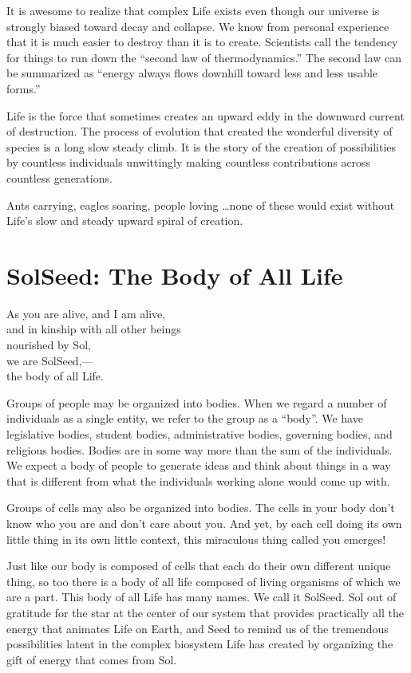 \documentclass[ebook,12pt,openany,twoside]{memoir}
\newcommand{\tab}{\hspace*{2em}}
\newcommand{\imagefacingchapter}[1]{
  \cleartoverso
  \clearpage \null
  \thispagestyle{cleared}
  \AddToShipoutPictureBG*{%
    \AtStockLowerLeft{%
      \texttt{[image: \#1]}
    }
  }
  \clearpage
}
\begin{document}
It is awesome to realize that complex Life exists even though our universe is
strongly biased toward decay and collapse. We know from personal experience
that it is much easier to destroy than it is to create. Scientists call the
tendency for things to run down the ``second law of thermodynamics.'' The
second law can be summarized as ``energy always flows downhill toward less and
less usable forms.''

Life is the force that sometimes creates an upward eddy in the downward current
of destruction. The process of evolution that created the wonderful diversity
of species is a long slow steady climb. It is the story of the creation of
possibilities by countless individuals unwittingly making countless
contributions across countless generations.

Ants carrying, eagles soaring, people loving \ldots none of these would exist
without Life's slow and steady upward spiral of creation.






\imagefacingchapter{images/BodyOfAllLife}
\chapter{SolSeed: The Body of All Life}

\setlength\epigraphwidth{2.4in}
\epigraph{
  As you are alive, and I am alive,\\
  and in kinship with all other beings\\
  nourished by Sol,\\
  \tab we are SolSeed,--- \\
  \tab the body of all Life.
}{}

\noindent Groups of people may be organized into bodies. When we regard a
number of individuals as a single entity, we refer to the group as a ``body''.
We have legislative bodies, student bodies, administrative bodies, governing
bodies, and religious bodies. Bodies are in some way more than the sum of the
individuals. We expect a body of people to generate ideas and think about
things in a way that is different from what the individuals working alone would
come up with.

Groups of cells may also be organized into bodies.  The cells in your body don't
know who you are and don't care about you. And yet, by each cell doing its own
little thing in its own little context, this miraculous thing called
you emerges!

Just like our body is composed of cells that each do their own different unique
thing, so too there is a body of all life composed of living organisms of which
we are a part. This body of all Life has many names. We call it SolSeed. Sol
out of gratitude for the star at the center of our system that provides
practically all the energy that animates Life on Earth, and Seed to remind us
of the tremendous possibilities latent in the complex biosystem Life has
created by organizing the gift of energy that comes from Sol.
\end{document}
